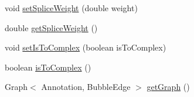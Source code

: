 \begin{DoxyCompactItemize}
\item 
void \hyperlink{classbroad_1_1pda_1_1seq_1_1graph_1_1_path_a348ec20a3d898b018e86c4a619c389b3}{set\+Splice\+Weight} (double weight)
\item 
double \hyperlink{classbroad_1_1pda_1_1seq_1_1graph_1_1_path_a92238c19edc6d4e647a0567e0619050c}{get\+Splice\+Weight} ()
\item 
void \hyperlink{classbroad_1_1pda_1_1seq_1_1graph_1_1_path_ae7e2b65737680bab483a22556e8438ab}{set\+Is\+To\+Complex} (boolean is\+To\+Complex)
\item 
boolean \hyperlink{classbroad_1_1pda_1_1seq_1_1graph_1_1_path_a00daa0a104035222bb606b658ed21b78}{is\+To\+Complex} ()
\item 
Graph$<$ Annotation, Bubble\+Edge $>$ \hyperlink{classbroad_1_1pda_1_1seq_1_1graph_1_1_path_a2f308b5d2202905e9d6af414cc379096}{get\+Graph} ()
\end{DoxyCompactItemize}


